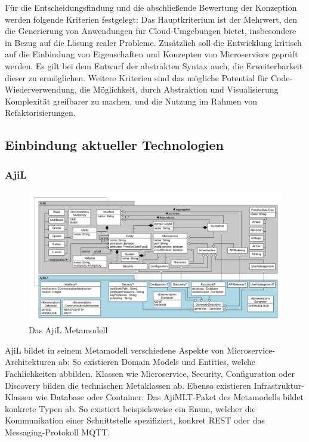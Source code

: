 Für die Entscheidungsfindung und die abschließende Bewertung der Konzeption werden folgende Kriterien festgelegt: Das Hauptkriterium ist der Mehrwert, den die Generierung von Anwendungen für Cloud-Umgebungen bietet, insbesondere in Bezug auf die Lösung realer Probleme. Zusätzlich soll die Entwicklung kritisch auf die Einbindung von Eigenschaften und Konzepten von Microservices geprüft werden. Es gilt bei dem Entwurf der abstrakten Syntax auch, die Erweiterbarkeit dieser zu ermöglichen. Weitere Kriterien sind das mögliche Potential für Code-Wiederverwendung, die Möglichkeit, durch Abstraktion und Visualisierung Komplexität greifbarer zu machen, und die Nutzung im Rahmen von Refaktorisierungen.

\subsection{Einbindung aktueller Technologien}

\subsubsection{AjiL}

\begin{figure}[ht]
\centering
\includegraphics[width=\textwidth]{bilder/k3/k3_ajil.png}
\caption[Das AjiL Metamodell]{Das AjiL Metamodell \cite{ajilGithub}}
\end{figure}

AjiL bildet in seinem Metamodell verschiedene Aspekte von Microservice-Architekturen ab: So existieren Domain Models und Entities, welche Fachlichkeiten abbilden. Klassen wie Microservice, Security, Configuration oder Discovery bilden die technischen Metaklassen ab. Ebenso existieren Infrastruktur-Klassen wie Database oder Container. Das AjiMLT-Paket des Metamodells bildet konkrete Typen ab. So existiert beispielsweise ein Enum, welcher die Kommunikation einer Schnittstelle spezifiziert, konkret REST oder das Messaging-Protokoll MQTT.

